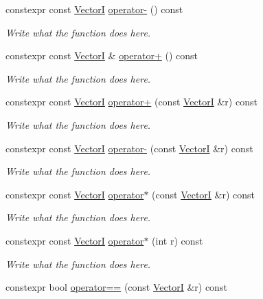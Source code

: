 \begin{DoxyCompactItemize}
\item 
constexpr const \hyperlink{structVectorI}{Vector\+I} \hyperlink{structVectorI_aec9804d8e49cd13029953b4f735b17b3}{operator-\/} () const 
\begin{DoxyCompactList}\small\item\em Write what the function does here. \end{DoxyCompactList}\item 
constexpr const \hyperlink{structVectorI}{Vector\+I} \& \hyperlink{structVectorI_a4823315c95c48f524d749d2a672036a4}{operator+} () const 
\begin{DoxyCompactList}\small\item\em Write what the function does here. \end{DoxyCompactList}\item 
constexpr const \hyperlink{structVectorI}{Vector\+I} \hyperlink{structVectorI_a7923217e5adb732f91df26fb707639f5}{operator+} (const \hyperlink{structVectorI}{Vector\+I} \&r) const 
\begin{DoxyCompactList}\small\item\em Write what the function does here. \end{DoxyCompactList}\item 
constexpr const \hyperlink{structVectorI}{Vector\+I} \hyperlink{structVectorI_ac57b6fca8650441fb3a8144b4a080132}{operator-\/} (const \hyperlink{structVectorI}{Vector\+I} \&r) const 
\begin{DoxyCompactList}\small\item\em Write what the function does here. \end{DoxyCompactList}\item 
constexpr const \hyperlink{structVectorI}{Vector\+I} \hyperlink{structVectorI_ad82d24734f13434ec3fc61177ac1c042}{operator$\ast$} (const \hyperlink{structVectorI}{Vector\+I} \&r) const 
\begin{DoxyCompactList}\small\item\em Write what the function does here. \end{DoxyCompactList}\item 
constexpr const \hyperlink{structVectorI}{Vector\+I} \hyperlink{structVectorI_a3b7a75ee052063bc7798f34627241ef0}{operator$\ast$} (int r) const 
\begin{DoxyCompactList}\small\item\em Write what the function does here. \end{DoxyCompactList}\item 
constexpr bool \hyperlink{structVectorI_a6923b76ab9703c3318571b9570a0c7f6}{operator==} (const \hyperlink{structVectorI}{Vector\+I} \&r) const 

\end{DoxyCompactItemize}

